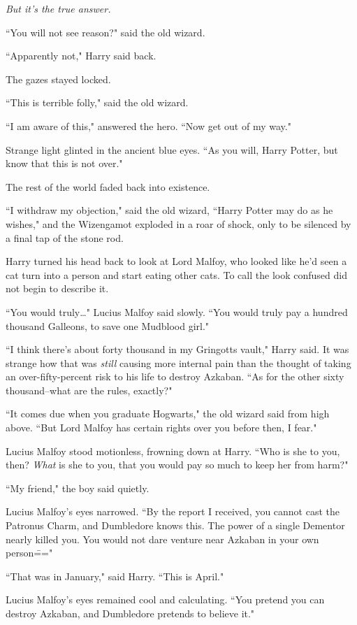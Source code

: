\emph{But it's the true answer.}

``You will not see reason?" said the old wizard.

``Apparently not," Harry said back.

The gazes stayed locked.

``This is terrible folly," said the old wizard.

``I am aware of this," answered the hero. ``Now get out of my way."

Strange light glinted in the ancient blue eyes. ``As you will, Harry Potter, but know that this is not over."

The rest of the world faded back into existence.

``I withdraw my objection," said the old wizard, ``Harry Potter may do as he wishes," and the Wizengamot exploded in a roar of shock, only to be silenced by a final tap of the stone rod.

Harry turned his head back to look at Lord Malfoy, who looked like he'd seen a cat turn into a person and start eating other cats. To call the look confused did not begin to describe it.

``You would truly{\ldots}" Lucius Malfoy said slowly. ``You would truly pay a hundred thousand Galleons, to save one Mudblood girl."

``I think there's about forty thousand in my Gringotts vault," Harry said. It was strange how that was \emph{still} causing more internal pain than the thought of taking an over-fifty-percent risk to his life to destroy Azkaban. ``As for the other sixty thousand\---what are the rules, exactly?"

``It comes due when you graduate Hogwarts," the old wizard said from high above. ``But Lord Malfoy has certain rights over you before then, I fear."

Lucius Malfoy stood motionless, frowning down at Harry. ``Who is she to you, then? \emph{What} is she to you, that you would pay so much to keep her from harm?"

``My friend," the boy said quietly.

Lucius Malfoy's eyes narrowed. ``By the report I received, you cannot cast the Patronus Charm, and Dumbledore knows this. The power of a single Dementor nearly killed you. You would not dare venture near Azkaban in your own person\==="

``That was in January," said Harry. ``This is April."

Lucius Malfoy's eyes remained cool and calculating. ``You pretend you can destroy Azkaban, and Dumbledore pretends to believe it."

